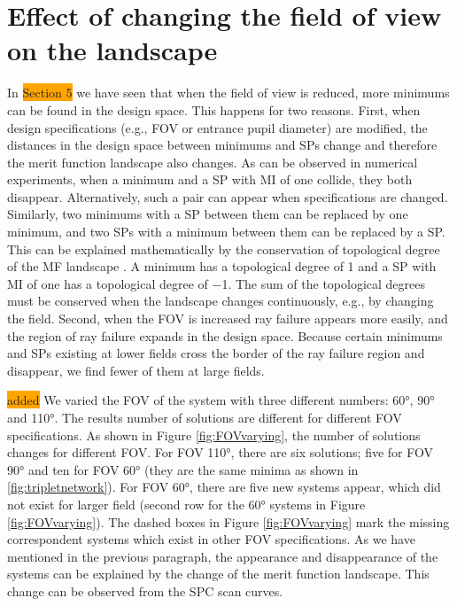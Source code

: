 \section{Effect of changing the field of view on the landscape}
In \colorbox{orange}{Section 5} we have seen that when the field of view is reduced, more minimums can be found in the design space. This happens for two reasons. First, when design specifications (e.g., FOV or entrance pupil diameter) are modified, the distances in the design space between minimums and SPs change
and therefore the merit function landscape also changes. As can be observed in numerical experiments, when a minimum and a SP with MI of one collide, they both disappear. Alternatively, such a pair can appear when specifications are changed. Similarly, two minimums with a SP between them can be replaced by one minimum, and two SPs with a minimum between them can be replaced by a SP. This can be explained mathematically by the conservation of topological degree of the MF landscape \cite{vanTurnhoutThesis2009}. A minimum has a topological degree of 1 and a SP with MI of one has a topological degree of −1. The sum of the topological degrees must be conserved when the landscape changes continuously, e.g., by changing the field. Second, when the FOV is increased ray failure appears more easily, and the region of ray failure expands in the design space. Because certain minimums and SPs existing at lower fields cross the border of the ray failure region and disappear, we find fewer of them at large fields.


\colorbox{orange}{added}
We varied the FOV of the system with three different numbers: 60°, 90° and 110°. The results number of solutions are different for different FOV specifications. As shown in Figure \ref{fig:FOVvarying}, the number of solutions changes for different FOV. For FOV 110°, there are six solutions; five for FOV 90° and ten for FOV 60° (they are the same minima as shown in \ref{fig:tripletnetwork}). For FOV 60°, there are five new systems appear, which did not exist for larger field (second row for the 60° systems in Figure \ref{fig:FOVvarying}). The dashed boxes in Figure \ref{fig:FOVvarying} mark the missing correspondent systems which exist in other FOV specifications. As we have mentioned in the previous paragraph, the appearance and disappearance of the systems can be explained by the change of the merit function landscape. This change can be observed from the SPC scan curves.  

